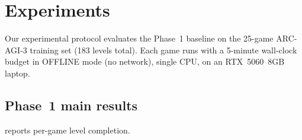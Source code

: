 \documentclass[10pt,letterpaper]{article}
\begin{document}
\section{Experiments}\label{sec:exp}

Our experimental protocol evaluates the Phase~1 baseline on the 25-game ARC-AGI-3 training set (183 levels total).
Each game runs with a 5-minute wall-clock budget in OFFLINE mode (no network), single CPU, on an RTX~5060~8GB laptop.

\subsection{Phase~1 main results}\label{sec:exp-main}

 reports per-game level completion.
\end{document}
